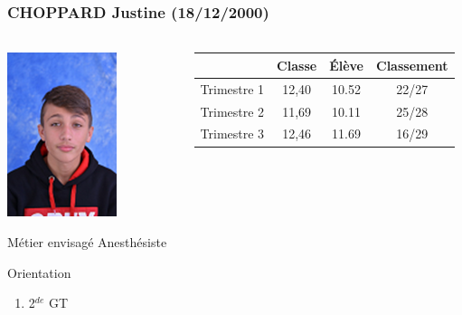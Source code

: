\documentclass{beamer}
\begin{document}
\begin{frame}
	\frametitle{CHOPPARD Justine (18/12/2000)}  
	\framesubtitle{ }	
	
	
	\begin{columns}[onlytextwidth]
		
		
		
		\begin{column}{0.3\textwidth}
			\vspace*{-.5cm}
			\begin{center}
				\includegraphics[scale=0.8]{tof}
			\end{center}
			
			
			{\small \begin{block}{Métier envisagé}
					Anesthésiste
				\end{block}
				
				\begin{alertblock}{Orientation}
					\begin{enumerate}
						\item 2$^{de}$ GT
						
					\end{enumerate}
				\end{alertblock}}
				
				
			\end{column}	
			
			\begin{column}{0.70\textwidth}
				
				\begin{center}
					
					\vspace*{-.7cm}	
					
					{\small 
						\colorbox{pastelgray}{
						\begin{tabular}{c|c|c|c}
							& {\color{red} Classe}                       & {\color{blue}\'Elève}                      & {\color{mygreen} Classement}                   \\ \hline
							Trimestre 1 & {\color{red} 12,40} & {\color{blue} 10.52} & {\color{mygreen} 22/27} \\ \hline
							Trimestre 2 & {\color{red} 11,69} & {\color{blue} 10.11} & {\color{mygreen} 25/28} \\ \hline
							Trimestre 3 & {\color{red} 12,46} & {\color{blue} 11.69} & {\color{mygreen} 16/29}
						\end{tabular}}
						}
						

\end{center}
\end{column}
\end{columns}
\end{frame}
\end{document}
